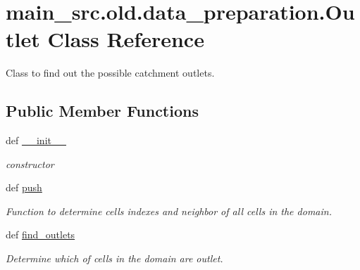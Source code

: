 \hypertarget{classmain__src_8old_1_1data__preparation_1_1Outlet}{\section{main\-\_\-src.\-old.\-data\-\_\-preparation.\-Outlet Class Reference}
\label{classmain__src_8old_1_1data__preparation_1_1Outlet}
}


Class to find out the possible catchment outlets.  


\subsection*{Public Member Functions}
\begin{DoxyCompactItemize}
\item 
\hypertarget{classmain__src_8old_1_1data__preparation_1_1Outlet_abf8cf59d791679da08965df8a67d5181}{def \hyperlink{classmain__src_8old_1_1data__preparation_1_1Outlet_abf8cf59d791679da08965df8a67d5181}{\-\_\-\-\_\-init\-\_\-\-\_\-}}\label{classmain__src_8old_1_1data__preparation_1_1Outlet_abf8cf59d791679da08965df8a67d5181}

\begin{DoxyCompactList}\small\item\em constructor \end{DoxyCompactList}\item 
\hypertarget{classmain__src_8old_1_1data__preparation_1_1Outlet_a3fbd37a67e1b5a8688813fb8884ed573}{def \hyperlink{classmain__src_8old_1_1data__preparation_1_1Outlet_a3fbd37a67e1b5a8688813fb8884ed573}{push}}\label{classmain__src_8old_1_1data__preparation_1_1Outlet_a3fbd37a67e1b5a8688813fb8884ed573}

\begin{DoxyCompactList}\small\item\em Function to determine cells indexes and neighbor of all cells in the domain. \end{DoxyCompactList}\item 
def \hyperlink{classmain__src_8old_1_1data__preparation_1_1Outlet_a9a77e03c7c5277a72604cdc4c2011486}{find\-\_\-outlets}
\begin{DoxyCompactList}\small\item\em Determine which of cells in the domain are outlet. \end{DoxyCompactList}\end{DoxyCompactItemize}
